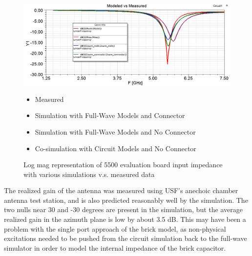 \documentclass[12pt]{usfcoe}
\begin{document}
    \begin{figure}[H]
		\begin{center}
        	\includegraphics[width=\textwidth]{images/5500_simulation/s11_log_mag.png} 
            \vspace{-\topsep}
            \begin{itemize}
                \centering
                \setlength{\parskip}{0pt}
                \setlength{\itemsep}{0pt} 
                \color{red}
                \item Measured
                \color{green}
                \item Simulation with Full-Wave Models and Connector
                \color{blue}
                \item Simulation with Full-Wave Models and No Connector
                \color{violet}
                \item Co-simulation with Circuit Models and No Connector
            \end{itemize}
            \vspace*{-9pt}
			\caption{Log mag representation of 5500 evaluation board input impedance with various simulations v.s. measured data} 
            \label{fig:5500_log_mag}

		\end{center}
    \end{figure}    

    The realized gain of the antenna was measured using USF's anechoic chamber antenna test station, and is also predicted reasonably well by the simulation.
    The two nulls near 30 and -30 degrees are present in the simulation, but the average realized gain in the azimuth plane is low by about 3.5 dB. 
    This may have been a problem with the single port approach of the brick model, as non-physical excitations needed to be pushed from the circuit simulation back to the full-wave simulator in order to model the internal impedance of the brick capacitor.
    
\end{document}
